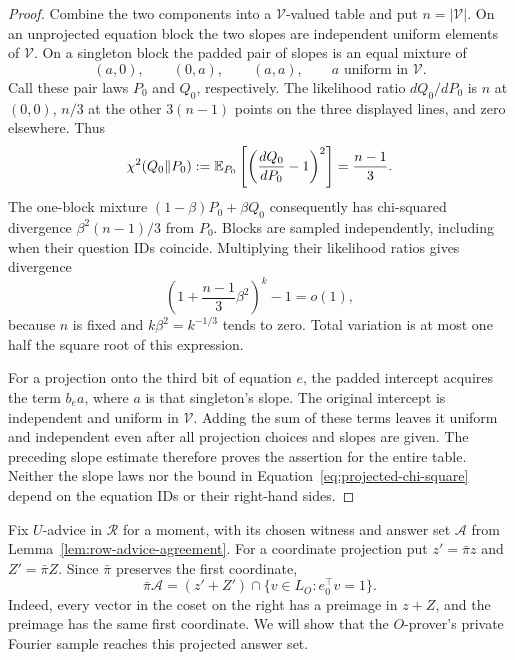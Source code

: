 \begin{proof}
Combine the two components into a $\mathcal V$-valued table and put
$n=|\mathcal V|$.  On an unprojected equation block the two slopes are
independent uniform elements of $\mathcal V$.  On a singleton block the
padded pair of slopes is an equal mixture of
\[
 (a,0),\qquad (0,a),\qquad (a,a),
 \qquad a\text{ uniform in }\mathcal V.
\]
Call these pair laws $P_0$ and $Q_0$, respectively.  The likelihood ratio
$dQ_0/dP_0$ is $n$ at $(0,0)$, $n/3$ at the other $3(n-1)$ points on
the three displayed lines, and zero elsewhere.  Thus
\[
 \chi^2(Q_0\Vert P_0)
 :=\mathbb E_{P_0}\left[\left(\frac{dQ_0}{dP_0}-1\right)^2\right]
 =\frac{n-1}{3}.
\]
The one-block mixture $(1-\beta)P_0+\beta Q_0$ consequently has
chi-squared divergence $\beta^2(n-1)/3$ from $P_0$.  Blocks are sampled
independently, including when their question IDs coincide.  Multiplying
their likelihood ratios gives divergence
\begin{equation}
 \left(1+\frac{n-1}{3}\beta^2\right)^k-1=o(1),
 \label{eq:projected-chi-square}
\end{equation}
because $n$ is fixed and $k\beta^2=k^{-1/3}$ tends to zero.  Total
variation is at most one half the square root of this expression.

For a projection onto the third bit of equation $e$, the padded intercept
acquires the term $b_e a$, where $a$ is that singleton's slope.  The
original intercept is independent and uniform in $\mathcal V$.  Adding
the sum of these terms leaves it uniform and independent even after all
projection choices and slopes are given.  The preceding slope estimate
therefore proves the assertion for the entire table.  Neither the slope
laws nor the bound in Equation~\eqref{eq:projected-chi-square} depend on
the equation IDs or their right-hand sides.
\end{proof}

Fix $U$-advice in $\mathcal R$ for a moment, with its chosen witness and answer set
$\mathcal A$ from Lemma~\ref{lem:row-advice-agreement}.  For a coordinate
projection put $z'=\bar\pi z$ and $Z'=\bar\pi Z$.  Since $\bar\pi$
preserves the first coordinate,
\begin{equation}
 \bar\pi\mathcal A
 =(z'+Z')\cap\{v\in L_O:e_0^\top v=1\}.
 \label{eq:projected-answer-set}
\end{equation}
Indeed, every vector in the coset on the right has a preimage in $z+Z$,
and the preimage has the same first coordinate.  We will show that the
$O$-prover's private Fourier sample reaches this projected answer set.

